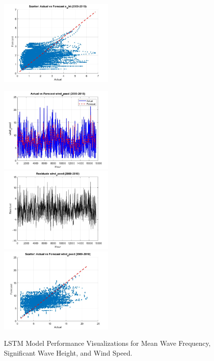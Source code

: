 \begin{figure}[ht!]
    \includegraphics[width=0.5\textwidth]{"graphs/lstm/s_wht/scatter plot.jpg"}\\[1ex]
\end{figure}
\begin{figure}
    \includegraphics[width=0.5\textwidth]{"graphs/lstm/wind_speed/actual vs forecast.jpg"}\hfill
    \includegraphics[width=0.5\textwidth]{"graphs/lstm/wind_speed/residuals.jpg"}\\[1ex]
    \centering
    \includegraphics[width=0.5\textwidth]{"graphs/lstm/wind_speed/scatter plot.jpg"}    
    \caption{LSTM Model Performance Visualizations for Mean Wave Frequency, Significant Wave Height, and Wind Speed.}
    \label{fig:lstm_all}
\end{figure}